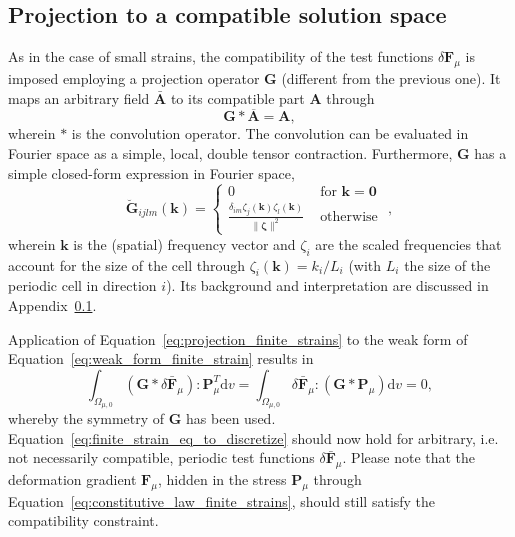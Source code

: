 \subsection{Projection to a compatible solution space}

As in the case of small strains, the compatibility of the test functions \(\delta \bm{F}_\mu\) is imposed employing a projection operator \(\bm{G}\) (different from the previous one).
It maps an arbitrary field \(\bar{\bm A}\) to its compatible part \(\bm A\) through
\begin{equation} \label{eq:projection_finite_strains}
\bm{G} * \overline{\bm{A}}=\bm{A},
\end{equation}
wherein \(*\) is the convolution operator.
The convolution can be evaluated in Fourier space as a simple, local, double tensor contraction.
Furthermore, \(\bm{G}\) has a simple closed-form expression in Fourier space,
\begin{equation}
\breve{\bm G}_{i j l m}\left(\bm{k}\right)=\begin{cases}
0 & \text { for } \bm k=\bm{0} \\[5pt]
\displaystyle{\frac{\delta_{i m} \zeta_{j}\left(\bm{k}\right) \zeta_{l}\left(\bm{k}\right)}{\|\bm{\zeta}\|^{2}} } & \text { otherwise }
\end{cases},
\end{equation}
wherein \(\bm{k}\) is the (spatial) frequency vector and \(\zeta_{i}\) are the scaled frequencies that account for the size of the cell through \(\zeta_{i}(\bm k)=k_{i} / L_{i}\) (with \(L_{i}\) the size of the periodic cell in direction \(i\)).
Its background and interpretation are discussed in Appendix~\ref{}.

Application of Equation~\ref{eq:projection_finite_strains} to the weak form of Equation~\ref{eq:weak_form_finite_strain} results in
\begin{equation} \label{eq:finite_strain_eq_to_discretize}
\int_{\Omega_{\mu,0}}(\bm{G} * \delta \bar{\bm{F}}_\mu): \bm{P}_\mu^{T} \mathrm{d} v=\int_{\Omega_{\mu,0}} \delta \bar{\bm{F}}_\mu:(\bm{G} * \bm{P}_\mu) \mathrm{d} v = 0,
\end{equation}
whereby the symmetry of \(\bm{G}\) has been used. Equation~\eqref{eq:finite_strain_eq_to_discretize} should now hold for arbitrary, i.e. not necessarily compatible, periodic test functions \(\delta \bar{\bm{F}}_\mu\).
Please note that the deformation gradient \(\bm{F}_\mu\), hidden in the stress \(\bm{P}_\mu\) through Equation~\eqref{eq:constitutive_law_finite_strains}, should still satisfy the compatibility constraint.

